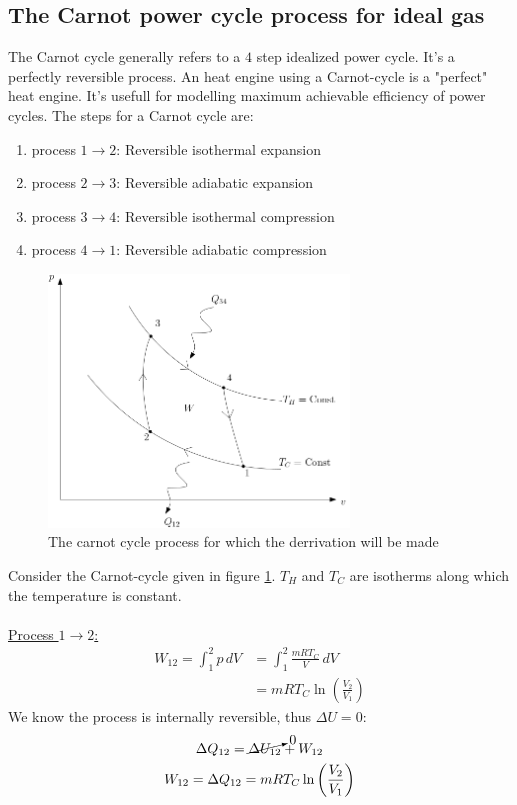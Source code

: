 \documentclass[11pt, a4paper]{article}
\begin{document}
\subsection{The Carnot power cycle process for ideal gas}
The Carnot cycle generally refers to a $4$ step idealized power cycle. It's a perfectly reversible process. An heat engine using a Carnot-cycle is a "perfect" heat engine. It's usefull for modelling maximum achievable efficiency of power cycles. The steps for a Carnot cycle are:
\begin{enumerate}
  \item process $1 \to 2$: Reversible isothermal expansion
  \item process $2 \to 3$: Reversible adiabatic expansion
  \item process $3 \to 4$: Reversible isothermal compression
  \item process $4 \to 1$: Reversible adiabatic compression
\end{enumerate}
\begin{figure}[h]
  \centerline{\includegraphics[width=80mm]{images/Carnot Cycle.png}}
  \caption{The carnot cycle process for which the derrivation will be made}
  \label{fig:Carnot_cycle}
\end{figure}
Consider the Carnot-cycle given in figure \ref{fig:Carnot_cycle}. $T_H$ and $T_C$ are isotherms along which the temperature is constant.\\
\\ 
\underline{Process $1 \to 2$:}
\begin{align}
  W_{12} = \int_1^2 p\,dV &= \int_1^2 \frac{mRT_C}{V}\,dV\\
                          &= mRT_C \ln \left( \frac{V_2}{V_1} \right)
\end{align}
We know the process is internally reversible, thus $\Delta U =0$:
\begin{gather}
  \Delta Q_{12} = \cancelto{0}{\Delta U_{12}} + W_{12}\\
  W_{12} = \Delta Q_{12} = mRT_C \ln \left( \frac{V_2}{V_1} \right)
\end{gather}\\
\end{document}
